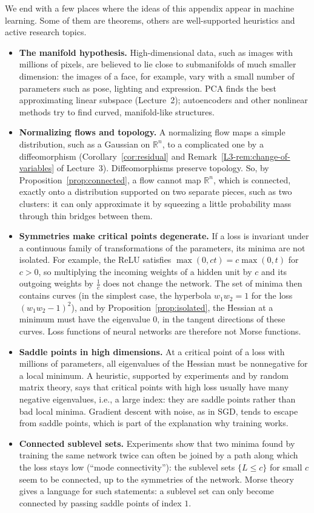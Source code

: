 \documentclass[11pt]{article}
\theoremstyle{definition}
\theoremstyle{plain}
\theoremstyle{remark}
\begin{document}
We end with a few places where the ideas of this appendix appear in machine learning. Some of them are theorems, others are well-supported heuristics and active research topics.
\begin{itemize}
    \item \textbf{The manifold hypothesis.} High-dimensional data, such as images with millions of pixels, are believed to lie close to submanifolds of much smaller dimension: the images of a face, for example, vary with a small number of parameters such as pose, lighting and expression. PCA finds the best approximating linear subspace (Lecture~2); autoencoders and other nonlinear methods try to find curved, manifold-like structures.
    \item \textbf{Normalizing flows and topology.} A normalizing flow maps a simple distribution, such as a Gaussian on $\mathbb{R}^n$, to a complicated one by a diffeomorphism (Corollary~\ref{cor:residual} and Remark~\ref{L3-rem:change-of-variables} of Lecture~3). Diffeomorphisms preserve topology. So, by Proposition~\ref{prop:connected}, a flow cannot map $\mathbb{R}^n$, which is connected, exactly onto a distribution supported on two separate pieces, such as two clusters: it can only approximate it by squeezing a little probability mass through thin bridges between them.
    \item \textbf{Symmetries make critical points degenerate.} If a loss is invariant under a continuous family of transformations of the parameters, its minima are not isolated. For example, the ReLU satisfies $\max(0, ct) = c\max(0, t)$ for $c > 0$, so multiplying the incoming weights of a hidden unit by $c$ and its outgoing weights by $\frac{1}{c}$ does not change the network. The set of minima then contains curves (in the simplest case, the hyperbola $w_1 w_2 = 1$ for the loss $(w_1 w_2 - 1)^2$), and by Proposition~\ref{prop:isolated}, the Hessian at a minimum must have the eigenvalue $0$, in the tangent directions of these curves. Loss functions of neural networks are therefore not Morse functions.
    \item \textbf{Saddle points in high dimensions.} At a critical point of a loss with millions of parameters, all eigenvalues of the Hessian must be nonnegative for a local minimum. A heuristic, supported by experiments and by random matrix theory, says that critical points with high loss usually have many negative eigenvalues, i.e., a large index: they are saddle points rather than bad local minima. Gradient descent with noise, as in SGD, tends to escape from saddle points, which is part of the explanation why training works.
    \item \textbf{Connected sublevel sets.} Experiments show that two minima found by training the same network twice can often be joined by a path along which the loss stays low (``mode connectivity''): the sublevel sets $\{L \leq c\}$ for small $c$ seem to be connected, up to the symmetries of the network. Morse theory gives a language for such statements: a sublevel set can only become connected by passing saddle points of index $1$.
\end{itemize}
\end{document}

